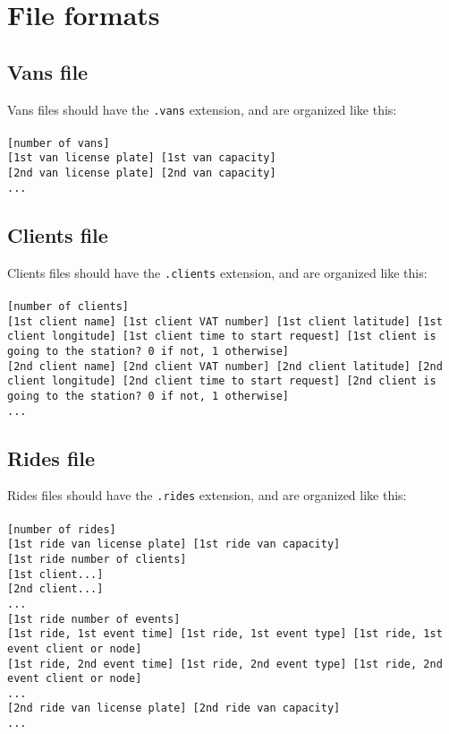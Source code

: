 \chapter{File formats} \label{appendix-fileformat}
\section{Vans file}
Vans files should have the \texttt{.vans} extension, and are organized like this:
\\
\\
\texttt{[number of vans]}\\
\texttt{[1st van license plate] [1st van capacity]}\\
\texttt{[2nd van license plate] [2nd van capacity]}\\
\texttt{...}


\section{Clients file}
Clients files should have the \texttt{.clients} extension, and are organized like this:
\\
\\
\texttt{[number of clients]}\\
\texttt{[1st client name] [1st client VAT number] [1st client latitude] [1st client longitude] [1st client time to start request] [1st client is going to the station? 0 if not, 1 otherwise]}\\
\texttt{[2nd client name] [2nd client VAT number] [2nd client latitude] [2nd client longitude] [2nd client time to start request] [2nd client is going to the station? 0 if not, 1 otherwise]}\\
\texttt{...}


\section{Rides file}
Rides files should have the \texttt{.rides} extension, and are organized like this:
\\
\\
\texttt{[number of rides]}\\
\texttt{[1st ride van license plate] [1st ride van capacity]}\\
\texttt{[1st ride number of clients]}\\
\texttt{[1st client...]}\\
\texttt{[2nd client...]}\\
\texttt{...}\\
\texttt{[1st ride number of events]}\\
\texttt{[1st ride, 1st event time] [1st ride, 1st event type] [1st ride, 1st event client or node]}\\
\texttt{[1st ride, 2nd event time] [1st ride, 2nd event type] [1st ride, 2nd event client or node]}\\
\texttt{...}\\
\texttt{[2nd ride van license plate] [2nd ride van capacity]}\\
\texttt{...}

